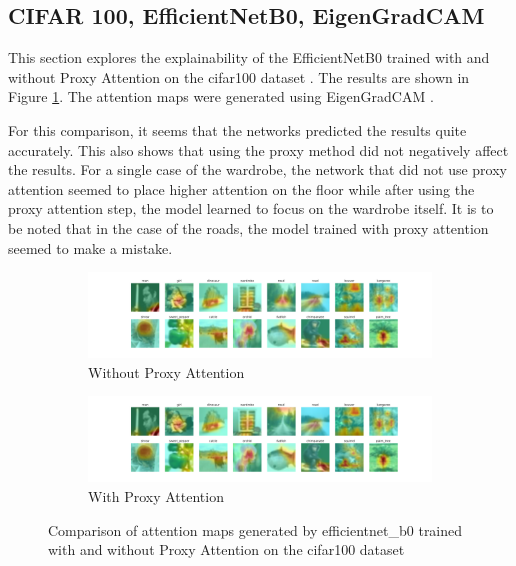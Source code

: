 \subsection{CIFAR 100, EfficientNetB0, EigenGradCAM}
This section explores the explainability of the EfficientNetB0 \cite{tanEfficientnetRethinkingModel2019} trained with and without Proxy Attention on the cifar100 dataset \cite{krizhevskyLearningMultipleLayers}. The results are shown in Figure \ref{fig:efficientnet_b0_cifar100}. The attention maps were generated using EigenGradCAM \cite{banymuhammadEigenCAMVisualExplanations2021}.

For this comparison, it seems that the networks predicted the results quite accurately. This also shows that using the proxy method did not negatively affect the results. For a single case of the wardrobe, the network that did not use proxy attention seemed to place higher attention on the floor while after using the proxy attention step, the model learned to focus on the wardrobe itself. It is to be noted that in the case of the roads, the model trained with proxy attention seemed to make a mistake.

\begin{figure}[!htb]
    \begin{subfigure}[b]{1\textwidth}
        \includegraphics[width=\linewidth]{images/cifar100_efficientnet_b0_noproxy_0.pdf}
        \caption{Without Proxy Attention}
    \end{subfigure}
    \begin{subfigure}[b]{1\textwidth}
        \includegraphics[width=\linewidth]{images/cifar100_efficientnet_b0_proxy_0.pdf}
        \caption{With Proxy Attention}
    \end{subfigure}

    \caption{Comparison of attention maps generated by efficientnet\_b0 trained with and without Proxy Attention on the cifar100 dataset}
    \label{fig:efficientnet_b0_cifar100}
\end{figure}
    


